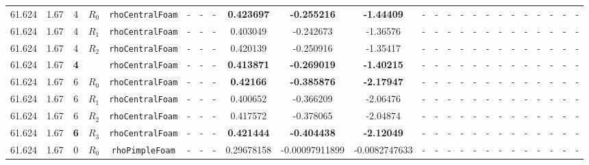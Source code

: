 \documentclass[12pt]{article}
\begin{document}
\begin{table}[H]
{\begin{tabular}{ccccc|ccc|ccc|ccc|ccc|ccccccc}
        61.624 & 1.67 & 4 & $R_0$ & \texttt{rhoCentralFoam} & - & - & - & \textbf{0.423697} & \textbf{-0.255216} & \textbf{-1.44409} & - & - & - & - & - & - & - & - & - & - & - & - & - \\
        \rowcolor{green!20}
        61.624 & 1.67 & 4 & $R_1$ & \texttt{rhoCentralFoam} & - & - & - & 0.403049 & -0.242673 & -1.36576 & - & - & - & - & - & - & - & - & - & - & - & - & - \\
        \rowcolor{green!30}
        61.624 & 1.67 & 4 & $R_2$ & \texttt{rhoCentralFoam} & - & - & - & 0.420139 & -0.250916 & -1.35417 & - & - & - & - & - & - & - & - & - & - & - & - & - \\
        \rowcolor{green!40} %
        61.624 & 1.67 & \cellcolor{lime}\textbf{4} & \cellcolor{cyan}{$R_3$} & \texttt{rhoCentralFoam} & - & - & - & \textbf{0.413871} & \textbf{-0.269019} & \textbf{-1.40215} & - & - & - & - & - & - & - & - & - & - & - & - & - \\
        \rowcolor{green!10}
        61.624 & 1.67 & 6 & $R_0$ & \texttt{rhoCentralFoam} & - & - & - & \textbf{0.42166} & \textbf{-0.385876} & \textbf{-2.17947} & - & - & - & - & - & - & - & - & - & - & - & - & - \\
        \rowcolor{green!20}
        61.624 & 1.67 & 6 & $R_1$ & \texttt{rhoCentralFoam} & - & - & - & 0.400652 & -0.366209 & -2.06476 & - & - & - & - & - & - & - & - & - & - & - & - & - \\
        \rowcolor{green!30}
        61.624 & 1.67 & 6 & $R_2$ & \texttt{rhoCentralFoam} & - & - & - & 0.417572 & -0.378065 & -2.04874 & - & - & - & - & - & - & - & - & - & - & - & - & - \\
        \rowcolor{green!40}
        61.624 & 1.67 & \cellcolor{lime}\textbf{6} & \cellcolor{cyan}$R_3$ & \texttt{rhoCentralFoam} & - & - & - & \textbf{0.421444} & \textbf{-0.404438} & \textbf{-2.12049} & - & - & - & - & - & - & - & - & - & - & - & - & - \\
        \rowcolor{blue!10}
        61.624 & 1.67 & 0 & $R_0$ & \texttt{rhoPimpleFoam} & - & - & - & 0.29678158 & -0.00097911899 & -0.0082747633 & - & - & - & - & - & - & - & - & - & - & - & - & - \\

\end{tabular}}
\end{table}
\end{document}
